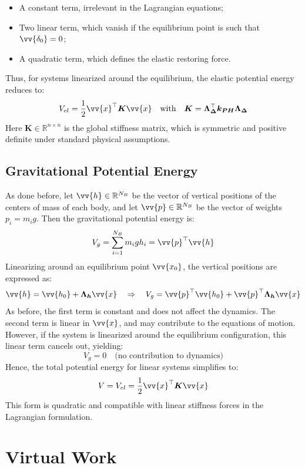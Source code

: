 \begin{itemize}
  \item A constant term, irrelevant in the Lagrangian equations;
  \item Two linear term, which vanish if the equilibrium point is such that \( \vv{\delta_0} = 0 \);
  \item A quadratic term, which defines the elastic restoring force.
\end{itemize}

Thus, for systems linearized around the equilibrium, the elastic potential energy reduces to:
\[
V_{el} = \frac{1}{2} \vv{x}^\top \boldsymbol{K} \vv{x}
\quad \text{with} \quad \boldsymbol{K} = \boldsymbol{\Lambda_{\Delta}}^\top \boldsymbol{k_{PH}} \boldsymbol{\Lambda_{\Delta}}
\]
Here \( \boldsymbol{K} \in \mathbb{R}^{n \times n} \) is the global stiffness matrix, which is symmetric and positive definite under standard physical assumptions.

\subsection{Gravitational Potential Energy}

As done before, let \( \vv{h} \in \mathbb{R}^{N_B} \) be the vector of vertical positions of the centers of mass of each body, and let \( \vv{p} \in \mathbb{R}^{N_B} \) be the vector of weights \( p_i = m_i g \). Then the gravitational potential energy is:
\[
V_g = \sum_{i=1}^{N_B} m_i g h_i = \vv{p}^\top \vv{h}
\]
Linearizing around an equilibrium point \( \vv{x_0} \), the vertical positions are expressed as:
\[
\vv{h} = \vv{h_0} + \boldsymbol{\Lambda_h} \vv{x}
\quad \Rightarrow \quad
V_g = \vv{p}^\top \vv{h_0} + \vv{p}^\top \boldsymbol{\Lambda_h} \vv{x}
\]
As before, the first term is constant and does not affect the dynamics. The second term is linear in \( \vv{x} \), and may contribute to the equations of motion. However, if the system is linearized around the equilibrium configuration, this linear term cancels out, yielding:
\[
V_g = 0 \quad \text{(no contribution to dynamics)}
\]
Hence, the total potential energy for linear systems simplifies to:
\[
V = V_{el} = \frac{1}{2} \vv{x}^\top \boldsymbol{K} \vv{x}
\]
This form is quadratic and compatible with linear stiffness forces in the Lagrangian formulation.

\section{Virtual Work}

